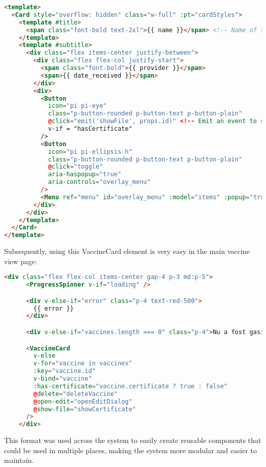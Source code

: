 \begin{lstlisting}[language=HTML, caption=Vue Vaccine Card]
    <template>
  <Card style="overflow: hidden" class="w-full" :pt="cardStyles">
    <template #title>
      <span class="font-bold text-2xl">{{ name }}</span> <!-- Name of the vaccine passed as a prop by the parent element -->
    </template>
    <template #subtitle>
      <div class="flex items-center justify-between">
        <div class="flex flex-col justify-start">
          <span class="font-bold">{{ provider }}</span>
          <span>{{ date_received }}</span> 
        </div>
        <div>
          <Button
            icon="pi pi-eye"
            class="p-button-rounded p-button-text p-button-plain"
            @click="emit('showFile', props.id)" <!-- Emit an event to show the certificate -->
            v-if = "hasCertificate"
          />
          <Button
            icon="pi pi-ellipsis-h"
            class="p-button-rounded p-button-text p-button-plain"
            @click="toggle"
            aria-haspopup="true"
            aria-controls="overlay_menu"
          />
          <Menu ref="menu" id="overlay_menu" :model="items" :popup="true" />
        </div>
      </div>
    </template>
  </Card>
</template>    
\end{lstlisting}

Subsequently, using this VaccineCard element is very easy in the main vaccine view page: 

\begin{lstlisting}[language=HTML, caption=Vue Vaccine View Page]
    <div class="flex flex-col items-center gap-4 p-3 md:p-5">
      <ProgressSpinner v-if="loading" />

      <div v-else-if="error" class="p-4 text-red-500">
        {{ error }}
      </div>

      <div v-else-if="vaccines.length === 0" class="p-4">Nu a fost gasit nici un vaccin.</div>

      <VaccineCard
        v-else
        v-for="vaccine in vaccines"
        :key="vaccine.id"
        v-bind="vaccine"
        :has-certificate="vaccine.certificate ? true : false"
        @delete="deleteVaccine"
        @open-edit="openEditDialog"
        @show-file="showCertificate"
      />
    </div>
\end{lstlisting}

This format was used across the system to easily create reusable components that could be used in multiple places, making the system more modular and easier to maintain.

